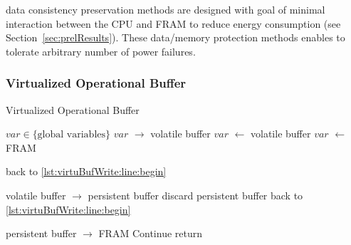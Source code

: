 \sys data consistency preservation methods are designed with goal of minimal interaction between the CPU and FRAM to reduce energy consumption (see Section~\ref{sec:prelResults}). These data/memory protection methods enables \sys to tolerate arbitrary number of power failures. 

\subsubsection{Virtualized Operational Buffer}

\begin{algorithm}[t]
	\caption{Virtualized Operational Buffer}
	\label{algo:virtuBufWrite}
	\scriptsize
	\begin{algorithmic}[1]
		\State $var \in \text{\{global variables\}} $ 
		\State \label{lst:virtuBufWrite:line:begin} 
		 
		\State $var$  $\rightarrow$ \textsf{volatile buffer} \label{lst:virtuBufWrite:line:output}
						\label{lst:virtuBufWrite:line:inputBegin}
		\State $var$  $\leftarrow$  \textsf{volatile buffer} 
		\Else 
		\State $var$  $\leftarrow$  \textsf{FRAM}		\label{lst:virtuBufWrite:line:inputEnd}
		\EndIf
		
		\State back to \ref{lst:virtuBufWrite:line:begin}
		\EndIf
		\EndWhile
		
		 \label{lst:virtuBufWrite:line:commitBegin} 
		\State \textsf{volatile buffer} $\rightarrow$  \textsf{persistent buffer}
		\State discard \textsf{persistent buffer}
		\State back to  \ref{lst:virtuBufWrite:line:begin} 
		\State   \label{lst:virtuBufWrite:line:commitEnd}
		\EndIf
		\EndWhile 
		
		 \label{lst:virtuBufWrite:line:SecCommitBegin} 
		\State \textsf{persistent buffer} $\rightarrow$ FRAM 
		\State Continue
		\EndIf
		\EndWhile 
		\State     \label{lst:virtuBufWrite:line:SecCommitEnd}
		\State return
	\end{algorithmic}
\end{algorithm}



